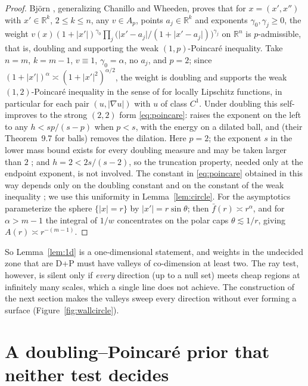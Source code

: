 \documentclass[11pt]{amsart}
\newcommand{\R}{\mathbb{R}}
\newcommand{\abs}[1]{\lvert #1\rvert}
\newcommand{\fbar}{\bar f}
\theoremstyle{plain}
\theoremstyle{definition}
\theoremstyle{remark}
\begin{document}
\begin{proof}
Bj\"orn \cite[Prop.~6]{bjorn2001}, generalizing Chanillo and Wheeden, proves
that for $x=(x',x'')$ with $x'\in\R^k$, $2\le k\le n$, any $v\in A_p$, points
$a_j\in\R^k$ and exponents $\gamma_0,\gamma_j\ge0$, the weight
$v(x)(1+\abs{x'})^{\gamma_0}\prod_j\bigl(\abs{x'-a_j}/(1+\abs{x'-a_j})\bigr)^{\gamma_j}$
on $\R^n$ is $p$-admissible, that is, doubling and supporting the weak
$(1,p)$-Poincar\'e inequality. Take $n=m$, $k=m-1$, $v\equiv1$,
$\gamma_0=\alpha$, no $a_j$, and $p=2$; since $(1+\abs{x'})^\alpha\asymp
(1+\abs{x'}^2)^{\alpha/2}$, the weight is doubling and supports the weak
$(1,2)$-Poincar\'e inequality in the sense of \cite[(5), p.~7]{hajlaszkoskela2000}
for locally Lipschitz functions, in particular for each pair
$(u,\abs{\nabla u})$ with $u$ of class $C^1$. Under doubling this self-improves
to the strong $(2,2)$ form \eqref{eq:poincare}:
\cite[Thm.~5.1]{hajlaszkoskela2000} raises the exponent on the left to any
$h<sp/(s-p)$ when $p<s$, with the energy on a dilated ball, and
\cite[Cor.~9.8]{hajlaszkoskela2000} (their Theorem~9.7 for balls) removes the
dilation. Here $p=2$; the exponent $s$ in the lower mass bound exists for
every doubling measure and may be taken larger than $2$
\cite[Lemma~14.6]{hajlaszkoskela2000}; and $h=2<2s/(s-2)$, so the truncation
property, needed only at the endpoint exponent, is not involved. The constant
in \eqref{eq:poincare} obtained in this way depends only on the doubling
constant and on the constant of the weak inequality
\cite[pp.~23 and~44]{hajlaszkoskela2000}; we use this uniformity in
Lemma~\ref{lem:circle}. For the
asymptotics parameterize the sphere $\{\abs x=r\}$ by $\abs{x'}=r\sin\theta$;
then $\fbar(r)\asymp r^\alpha$, and for $\alpha>m-1$ the integral of $1/w$
concentrates on the polar caps $\theta\lesssim1/r$, giving
$A(r)\asymp r^{-(m-1)}$.
\end{proof}

So Lemma~\ref{lem:1d} is a one-dimensional statement, and weights in the
undecided zone that are D+P must have valleys of co-dimension at least two. The
ray test, however, is silent only if \emph{every} direction (up to a null set)
meets cheap regions at infinitely many scales, which a single line does not
achieve. The construction of the next section makes the valleys sweep every
direction without ever forming a surface (Figure~\ref{fig:wallcircle}).

\section{A doubling--Poincar\'e prior that neither test decides}\label{sec:lattice}
\end{document}

